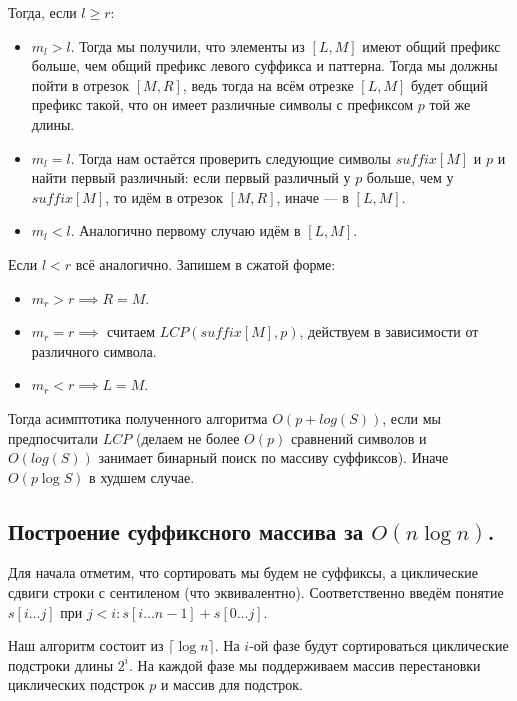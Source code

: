 \begin{enumerate}
        Тогда, если $l \geq r$:
        \begin{itemize}
                \item $m_{l} > l$. Тогда мы получили, что элементы из $[L, M]$ имеют общий префикс больше, 
                чем общий префикс левого суффикса и паттерна. Тогда мы должны пойти в отрезок $[M, R]$,
                ведь тогда на всём отрезке $[L, M]$ будет общий префикс такой, что он имеет различные
                символы с префиксом $p$ той же длины.
                \item $m_{l} = l$. Тогда нам остаётся проверить следующие символы $suffix[M]$ и $p$ и найти
                первый различный: если первый различный у  $p$ больше, чем у $suffix[M]$, то идём в отрезок
                $[M, R]$, иначе --- в $[L, M]$.
                \item $m_{l} < l$. Аналогично первому случаю идём в $[L, M]$.
        \end{itemize}

        Если $l < r$ всё аналогично. Запишем в сжатой форме:
        \begin{itemize}
                \item $m_{r} > r \implies R = M$.
                \item $m_{r} = r \implies$ считаем $LCP(suffix[M], p)$, действуем в зависимости от различного
                символа.
                \item $m_{r} < r \implies L = M$.
        \end{itemize}
\end{enumerate}

Тогда асимптотика полученного алгоритма $O(p + log(S))$, если мы предпосчитали $LCP$ (делаем не более $O(p)$
сравнений символов и  $O(log(S))$ занимает бинарный поиск по массиву суффиксов). Иначе $O(p \log S)$ в
худшем случае.

\subsection{Построение суффиксного массива за $O(n \log n)$.}

Для начала отметим, что сортировать мы будем не суффиксы, а циклические сдвиги строки с сентиленом
(что эквивалентно). Соответственно введём понятие 
$s[i\ldots j] \text{ при } j < i \colon s[i\ldots n-1] + s[0\ldots j]$.

Наш алгоритм состоит из $\lceil \log n \rceil$. На $i$-ой фазе будут сортироваться циклические подстроки
длины $2^{i}$. На каждой фазе мы поддерживаем массив перестановки циклических подстрок $p$ и 
массив  для подстрок.

